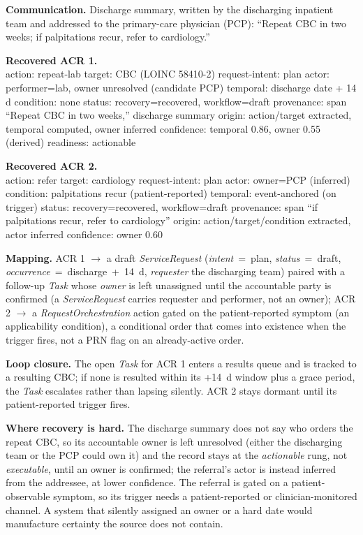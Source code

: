 \documentclass[3p,twocolumn]{elsarticle}
\begin{document}
\textbf{Communication.} Discharge summary, written by the discharging inpatient team and addressed to the primary-care physician (PCP): ``Repeat CBC in two weeks; if palpitations recur, refer to cardiology.''

\textbf{Recovered ACR 1.}\\
{action: repeat-lab} {target: CBC (LOINC 58410-2)} {request-intent: plan} {actor: performer=lab, owner unresolved (candidate PCP)} {temporal: discharge date + 14 d} {condition: none} {status: recovery=recovered, workflow=draft} {provenance: span ``Repeat CBC in two weeks,'' discharge summary} {origin: action/target extracted, temporal computed, owner inferred} {confidence: temporal 0.86, owner 0.55} {(derived) readiness: actionable}

\textbf{Recovered ACR 2.}\\
{action: refer} {target: cardiology} {request-intent: plan} {actor: owner=PCP (inferred)} {condition: palpitations recur (patient-reported)} {temporal: event-anchored (on trigger)} {status: recovery=recovered, workflow=draft} {provenance: span ``if palpitations recur, refer to cardiology''} {origin: action/target/condition extracted, actor inferred} {confidence: owner 0.60}

\textbf{Mapping.} ACR 1 $\rightarrow$ a draft \emph{ServiceRequest} (\emph{intent}~=~plan, \emph{status}~=~draft, \emph{occurrence}~=~discharge~+~14~d, \emph{requester} the discharging team) paired with a follow-up \emph{Task} whose \emph{owner} is left unassigned until the accountable party is confirmed (a \emph{ServiceRequest} carries requester and performer, not an owner); ACR 2 $\rightarrow$ a \emph{RequestOrchestration} action gated on the patient-reported symptom (an applicability condition), a conditional order that comes into existence when the trigger fires, not a PRN flag on an already-active order.

\textbf{Loop closure.} The open \emph{Task} for ACR 1 enters a results queue and is tracked to a resulting CBC; if none is resulted within its +14~d window plus a grace period, the \emph{Task} escalates rather than lapsing silently. ACR 2 stays dormant until its patient-reported trigger fires.

\textbf{Where recovery is hard.} The discharge summary does not say who orders the repeat CBC, so its accountable owner is left unresolved (either the discharging team or the PCP could own it) and the record stays at the \emph{actionable} rung, not \emph{executable}, until an owner is confirmed; the referral's actor is instead inferred from the addressee, at lower confidence. The referral is gated on a patient-observable symptom, so its trigger needs a patient-reported or clinician-monitored channel. A system that silently assigned an owner or a hard date would manufacture certainty the source does not contain.
\end{document}
